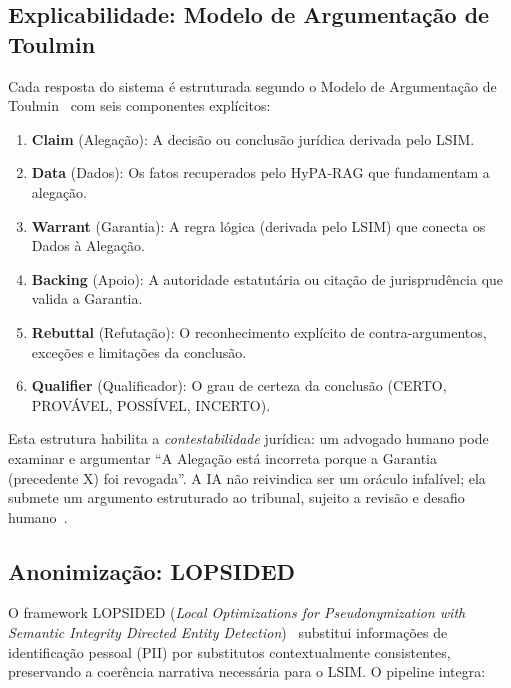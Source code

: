 \documentclass[journal,10pt]{IEEEtran}
\begin{document}
\subsection{Explicabilidade: Modelo de Argumenta\c{c}\~{a}o de Toulmin}

Cada resposta do sistema \'{e} estruturada segundo o Modelo de Argumenta\c{c}\~{a}o de Toulmin~\cite{refteorico2025,vassiliades2025a} com seis componentes expl\'{i}citos:

\begin{enumerate}    \item \textbf{Claim} (Alega\c{c}\~{a}o): A decis\~{a}o ou conclus\~{a}o jur\'{i}dica derivada pelo LSIM.
    \item \textbf{Data} (Dados): Os fatos recuperados pelo HyPA-RAG que fundamentam a alega\c{c}\~{a}o.
    \item \textbf{Warrant} (Garantia): A regra l\'{o}gica (derivada pelo LSIM) que conecta os Dados \`{a} Alega\c{c}\~{a}o.
    \item \textbf{Backing} (Apoio): A autoridade estatut\'{a}ria ou cita\c{c}\~{a}o de jurisprud\^{e}ncia que valida a Garantia.
    \item \textbf{Rebuttal} (Refuta\c{c}\~{a}o): O reconhecimento expl\'{i}cito de contra-argumentos, exce\c{c}\~{o}es e limita\c{c}\~{o}es da conclus\~{a}o.
    \item \textbf{Qualifier} (Qualificador): O grau de certeza da conclus\~{a}o (CERTO, PROV\'{A}VEL, POSS\'{I}VEL, INCERTO).
\end{enumerate}

Esta estrutura habilita a \textit{contestabilidade} jur\'{i}dica: um advogado humano pode examinar e argumentar ``A Alega\c{c}\~{a}o est\'{a} incorreta porque a Garantia (precedente X) foi revogada''. A IA n\~{a}o reivindica ser um or\'{a}culo infal\'{i}vel; ela submete um argumento estruturado ao tribunal, sujeito a revis\~{a}o e desafio humano~\cite{vassiliades2025a}.

\subsection{Anonimiza\c{c}\~{a}o: LOPSIDED}

O framework LOPSIDED (\textit{Local Optimizations for Pseudonymization with Semantic Integrity Directed Entity Detection})~\cite{lopsided2025a} substitui informa\c{c}\~{o}es de identifica\c{c}\~{a}o pessoal (PII) por substitutos contextualmente consistentes, preservando a coer\^{e}ncia narrativa necess\'{a}ria para o LSIM. O pipeline integra:
\end{document}
